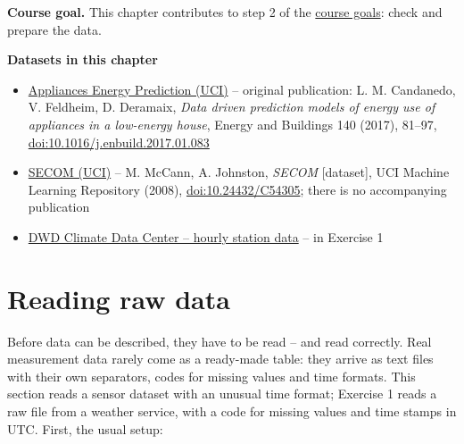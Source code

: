 \documentclass[
  letterpaper,
  DIV=11,
  numbers=noendperiod]{scrreprt}
\providecommand{\tightlist}{%
  \setlength{\itemsep}{0pt}\setlength{\parskip}{0pt}}\usepackage{longtable,booktabs,array}
\begin{document}
\textbf{Course goal.} This chapter contributes to step 2 of the
\hyperref[what-you-will-be-able-to-do]{course goals}: check and prepare
the data.

\textbf{Datasets in this chapter}

\begin{itemize}
\tightlist
\item
  \href{https://archive.ics.uci.edu/dataset/374/appliances+energy+prediction}{Appliances
  Energy Prediction (UCI)} -- original publication: L. M. Candanedo, V.
  Feldheim, D. Deramaix, \emph{Data driven prediction models of energy
  use of appliances in a low-energy house}, Energy and Buildings 140
  (2017), 81--97,
  \href{https://doi.org/10.1016/j.enbuild.2017.01.083}{doi:10.1016/j.enbuild.2017.01.083}
\item
  \href{https://archive.ics.uci.edu/dataset/179/secom}{SECOM (UCI)} --
  M. McCann, A. Johnston, \emph{SECOM} {[}dataset{]}, UCI Machine
  Learning Repository (2008),
  \href{https://doi.org/10.24432/C54305}{doi:10.24432/C54305}; there is
  no accompanying publication
\item
  \href{https://opendata.dwd.de/climate_environment/CDC/}{DWD Climate
  Data Center -- hourly station data} -- in Exercise 1
\end{itemize}

\section{Reading raw data}\label{sec-raw-data}

Before data can be described, they have to be read -- and read
correctly. Real measurement data rarely come as a ready-made table: they
arrive as text files with their own separators, codes for missing values
and time formats. This section reads a sensor dataset with an unusual
time format; Exercise 1 reads a raw file from a weather service, with a
code for missing values and time stamps in UTC. First, the usual setup:
\end{document}
